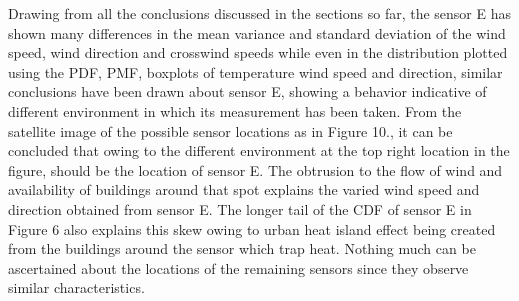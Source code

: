 \documentclass[a4paper]{article}
\begin{document}
{
\small
\begin{table}[htbp]
  \centering
  \caption{Pairwise Pearson's correlation of  Wet Bulb Globe Temperature}
\end{table}
}

Drawing from all the conclusions discussed in the sections so far, the sensor E has shown many differences in the mean variance and standard deviation of the wind speed, wind direction and crosswind speeds while even in the distribution plotted using the PDF, PMF, boxplots of temperature wind speed and direction, similar conclusions have been drawn about sensor E, showing a behavior indicative of different environment in which its measurement has been taken. From the satellite image of the possible sensor locations as in Figure 10., it can be concluded that owing to the different environment at the top right location in the figure, should be the location of sensor E. The obtrusion to the flow of wind and availability of buildings around that spot explains the varied wind speed and direction obtained from sensor E. The longer tail of the CDF of sensor E in Figure 6 also explains this skew owing to urban heat island effect being created from the buildings around the sensor which trap heat.
Nothing much can be ascertained about the locations of the remaining sensors since they observe similar characteristics.
\end{document}
